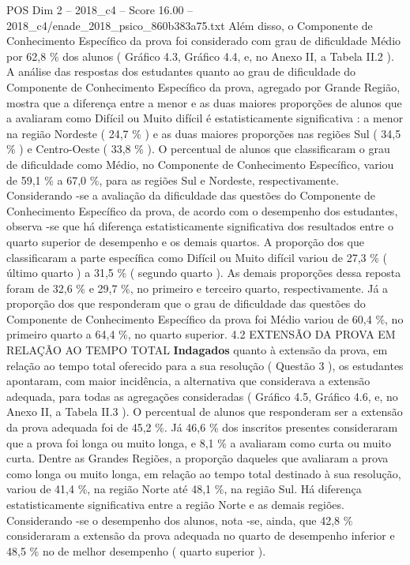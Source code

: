 \begin{textsample}{POS Dim 2 – 2018\_c4 – Score 16.00 – 2018\_c4/enade\_2018\_psico\_860b383a75.txt}
Além disso, o Componente de Conhecimento Específico da prova foi considerado com grau de dificuldade Médio por 62,8 \% dos alunos ( Gráfico 4.3, Gráfico 4.4, e, no Anexo II, a Tabela II.2 ).
A análise das respostas dos estudantes quanto ao grau de dificuldade do Componente de Conhecimento Específico da prova, agregado por Grande Região, mostra que a diferença entre a menor e as duas maiores proporções de alunos que a avaliaram como Difícil ou Muito difícil é estatisticamente significativa : a menor na região Nordeste ( 24,7 \% ) e as duas maiores proporções nas regiões Sul ( 34,5 \% ) e Centro-Oeste ( 33,8 \% ).
O percentual de alunos que classificaram o grau de dificuldade como Médio, no Componente de Conhecimento Específico, variou de 59,1 \% a 67,0 \%, para as regiões Sul e Nordeste, respectivamente.
Considerando -se a avaliação da dificuldade das questões do Componente de Conhecimento Específico da prova, de acordo com o desempenho dos estudantes, observa -se que há diferença estatisticamente significativa dos resultados entre o quarto superior de desempenho e os demais quartos.
A proporção dos que classificaram a parte específica como Difícil ou Muito difícil variou de 27,3 \% ( último quarto ) a 31,5 \% ( segundo quarto ).
As demais proporções dessa reposta foram de 32,6 \% e 29,7 \%, no primeiro e terceiro quarto, respectivamente.
Já a proporção dos que responderam que o grau de dificuldade das questões do Componente de Conhecimento Específico da prova foi Médio variou de 60,4 \%, no primeiro quarto a 64,4 \%, no quarto superior. 4.2 EXTENSÃO DA PROVA EM RELAÇÃO AO TEMPO TOTAL \textbf{Indagados} quanto à extensão da prova, em relação ao tempo total oferecido para a sua resolução ( Questão 3 ), os estudantes apontaram, com maior incidência, a alternativa que considerava a extensão adequada, para todas as agregações consideradas ( Gráfico 4.5, Gráfico 4.6, e, no Anexo II, a Tabela II.3 ).
O percentual de alunos que responderam ser a extensão da prova adequada foi de 45,2 \%.
Já 46,6 \% dos inscritos presentes consideraram que a prova foi longa ou muito longa, e 8,1 \% a avaliaram como curta ou muito curta.
Dentre as Grandes Regiões, a proporção daqueles que avaliaram a prova como longa ou muito longa, em relação ao tempo total destinado à sua resolução, variou de 41,4 \%, na região Norte até 48,1 \%, na região Sul.
Há diferença estatisticamente significativa entre a região Norte e as demais regiões.
Considerando -se o desempenho dos alunos, nota -se, ainda, que 42,8 \% consideraram a extensão da prova adequada no quarto de desempenho inferior e 48,5 \% no de melhor desempenho ( quarto superior ).

\end{textsample}
